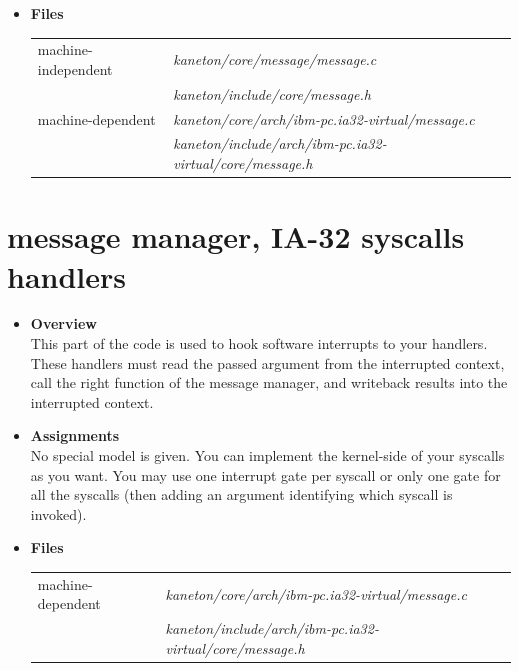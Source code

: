 \begin{itemize}
  \item {\bf {Files}}\\

    \begin{tabular}{| l | l |}
      \hline
      machine-independent & {\em kaneton/core/message/message.c}\\
      &  {\em kaneton/include/core/message.h}\\\hline
      machine-dependent & {\em kaneton/core/arch/ibm-pc.ia32-virtual/message.c}\\
      & {\em kaneton/include/arch/ibm-pc.ia32-virtual/core/message.h}\\\hline
    \end{tabular}
\end{itemize}

\newpage

\section{message manager, \textbf{IA-32 syscalls handlers}}
\begin{itemize}
  \item {\bf Overview}\\

    This part of the code is used to hook software interrupts to your
    handlers. These handlers must read the passed argument from the
    interrupted context, call the right function of the message
    manager, and writeback results into the interrupted context.

  \item {\bf Assignments}\\

    No special model is given. You can implement the kernel-side of
    your syscalls as you want. You may use one interrupt gate per
    syscall or only one gate for all the syscalls (then adding an
    argument identifying which syscall is invoked).

  \item {\bf {Files}}\\

    \begin{tabular}{| l | l |}
      \hline
      machine-dependent & {\em kaneton/core/arch/ibm-pc.ia32-virtual/message.c}\\
      & {\em kaneton/include/arch/ibm-pc.ia32-virtual/core/message.h}\\\hline
    \end{tabular}

\end{itemize}

